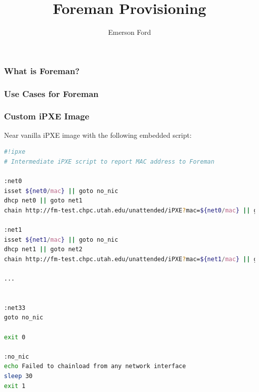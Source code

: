 \documentclass{beamer}
\title{Foreman Provisioning}
\author{Emerson Ford}
\date{}
\begin{document}
\frame{\titlepage}

\begin{frame}
	\frametitle{What is Foreman?}

\end{frame}

\begin{frame}
	\frametitle{Use Cases for Foreman}

\end{frame}

\begin{frame}[fragile]
	\frametitle{Custom iPXE Image}
	\flushleft
	Near vanilla iPXE image with the following embedded script:

	\centering
	\begin{lstlisting}[language=bash,frame=single,basicstyle=\fontsize{4}{6pt}\selectfont]
#!ipxe
# Intermediate iPXE script to report MAC address to Foreman

:net0
isset ${net0/mac} || goto no_nic
dhcp net0 || goto net1
chain http://fm-test.chpc.utah.edu/unattended/iPXE?mac=${net0/mac} || goto net1

:net1
isset ${net1/mac} || goto no_nic
dhcp net1 || goto net2
chain http://fm-test.chpc.utah.edu/unattended/iPXE?mac=${net1/mac} || goto net2

...


:net33
goto no_nic

exit 0

:no_nic
echo Failed to chainload from any network interface
sleep 30
exit 1
  \end{lstlisting}

\end{frame}
\end{document}
